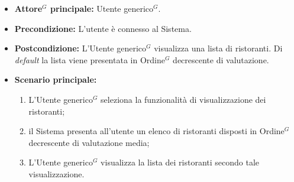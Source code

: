 \label{usecase:Visualizzazione elenco ristoranti}
\begin{itemize}
	\item \textbf{\gls{Attore}$^G$ principale:} \gls{Utente generico}$^G$.

	\item \textbf{Precondizione:}
	      L'utente è connesso al Sistema.

	\item \textbf{Postcondizione:} L'\gls{Utente generico}$^G$ visualizza una lista di
	      ristoranti. Di \textit{default} la lista viene presentata in \gls{Ordine}$^G$ decrescente di valutazione.

	\item \textbf{Scenario principale:}
	      \begin{enumerate}
		      \item L'\gls{Utente generico}$^G$ seleziona la funzionalità di
		            visualizzazione dei ristoranti;

		      \item il Sistema presenta all'utente un elenco di ristoranti disposti in \gls{Ordine}$^G$ decrescente di valutazione media;

		      \item L'\gls{Utente generico}$^G$ visualizza la lista dei ristoranti secondo tale visualizzazione.

	      \end{enumerate}
\end{itemize}
